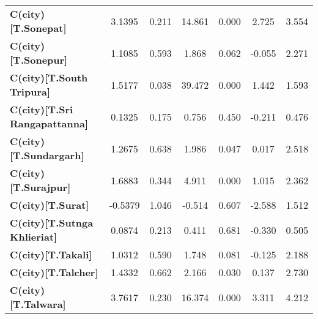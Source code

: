 \begin{center}
\begin{tabular}{lcccccc}
\textbf{C(city)[T.Sonepat]}                                                                         &       3.1395  &        0.211     &    14.861  &         0.000        &        2.725    &        3.554     \\
\textbf{C(city)[T.Sonepur]}                                                                         &       1.1085  &        0.593     &     1.868  &         0.062        &       -0.055    &        2.271     \\
\textbf{C(city)[T.South Tripura]}                                                                   &       1.5177  &        0.038     &    39.472  &         0.000        &        1.442    &        1.593     \\
\textbf{C(city)[T.Sri Rangapattanna]}                                                               &       0.1325  &        0.175     &     0.756  &         0.450        &       -0.211    &        0.476     \\
\textbf{C(city)[T.Sundargarh]}                                                                      &       1.2675  &        0.638     &     1.986  &         0.047        &        0.017    &        2.518     \\
\textbf{C(city)[T.Surajpur]}                                                                        &       1.6883  &        0.344     &     4.911  &         0.000        &        1.015    &        2.362     \\
\textbf{C(city)[T.Surat]}                                                                           &      -0.5379  &        1.046     &    -0.514  &         0.607        &       -2.588    &        1.512     \\
\textbf{C(city)[T.Sutnga Khlieriat]}                                                                &       0.0874  &        0.213     &     0.411  &         0.681        &       -0.330    &        0.505     \\
\textbf{C(city)[T.Takali]}                                                                          &       1.0312  &        0.590     &     1.748  &         0.081        &       -0.125    &        2.188     \\
\textbf{C(city)[T.Talcher]}                                                                         &       1.4332  &        0.662     &     2.166  &         0.030        &        0.137    &        2.730     \\
\textbf{C(city)[T.Talwara]}                                                                         &       3.7617  &        0.230     &    16.374  &         0.000        &        3.311    &        4.212     \\

\end{tabular}
\end{center}
